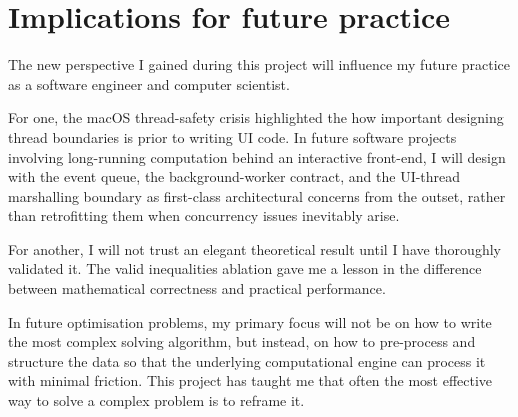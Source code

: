 \section{Implications for future practice}\label{sec:implications}

The new perspective I gained during this project will influence my future practice as a software engineer and computer scientist.

For one, the macOS thread-safety crisis highlighted the how important designing thread boundaries is prior to writing UI code. In future software projects involving long-running computation behind an interactive front-end, I will design with the event queue, the background-worker contract, and the UI-thread marshalling boundary as first-class architectural concerns from the outset, rather than retrofitting them when concurrency issues inevitably arise.

For another, I will not trust an elegant theoretical result until I have thoroughly validated it. The valid inequalities ablation gave me a lesson in the difference between mathematical correctness and practical performance.

In future optimisation problems, my primary focus will not be on how to write the most complex solving algorithm, but instead, on how to pre-process and structure the data so that the underlying computational engine can process it with minimal friction. This project has taught me that often the most effective way to solve a complex problem is to reframe it.